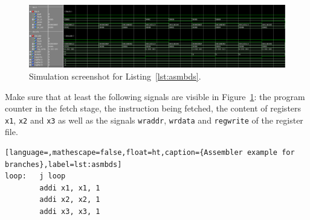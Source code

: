 \begin{figure}[ht!]
	\centering
	\includegraphics[width=1.0\linewidth]{ctrl.png}
	\caption{Simulation screenshot for Listing~\ref{lst:asmbds}.}
	\label{fig:sim2}
\end{figure}

Make sure that at least the following signals are visible in
Figure~\ref{fig:sim2}: the program counter in the fetch stage, the
instruction being fetched, the content of registers \texttt{x1}, 
\texttt{x2} and \texttt{x3} as well as the signals \texttt{wraddr},
\texttt{wrdata} and \texttt{regwrite} of the register file.

\begin{lstlisting}[language=,mathescape=false,float=ht,caption={Assembler example for branches},label=lst:asmbds]
loop:   j loop
        addi x1, x1, 1
        addi x2, x2, 1
        addi x3, x3, 1
\end{lstlisting}

